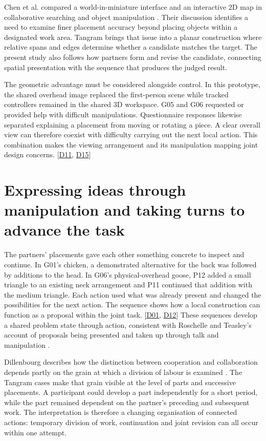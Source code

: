 Chen et al. compared a world-in-miniature interface and an interactive 2D map in collaborative searching and object manipulation \cite{chen2024}. Their discussion identifies a need to examine finer placement accuracy beyond placing objects within a designated work area. Tangram brings that issue into a planar construction where relative spans and edges determine whether a candidate matches the target. The present study also follows how partners form and revise the candidate, connecting spatial presentation with the sequence that produces the judged result.

The geometric advantage must be considered alongside control. In this prototype, the shared overhead image replaced the first-person scene while tracked controllers remained in the shared 3D workspace. G05 and G06 requested or provided help with difficult manipulations. Questionnaire responses likewise separated explaining a placement from moving or rotating a piece. A clear overall view can therefore coexist with difficulty carrying out the next local action. This combination makes the viewing arrangement and its manipulation mapping joint design concerns. [\hyperlink{src:D11}{D11}, \hyperlink{src:D15}{D15}]

\section{Expressing ideas through manipulation and taking turns to advance the task}\label{sec:6-2}

The partners' placements gave each other something concrete to inspect and continue. In G01's chicken, a demonstrated alternative for the back was followed by additions to the head. In G06's physical-overhead goose, P12 added a small triangle to an existing neck arrangement and P11 continued that addition with the medium triangle. Each action used what was already present and changed the possibilities for the next action. The sequence shows how a local construction can function as a proposal within the joint task. [\hyperlink{src:D01}{D01}, \hyperlink{src:D12}{D12}] These sequences develop a shared problem state through action, consistent with Roschelle and Teasley's account of proposals being presented and taken up through talk and manipulation \cite{roschelle1995}.

Dillenbourg describes how the distinction between cooperation and collaboration depends partly on the grain at which a division of labour is examined \cite{dillenbourg1999}. The Tangram cases make that grain visible at the level of parts and successive placements. A participant could develop a part independently for a short period, while the part remained dependent on the partner's preceding and subsequent work. The interpretation is therefore a changing organisation of connected actions: temporary division of work, continuation and joint revision can all occur within one attempt.

